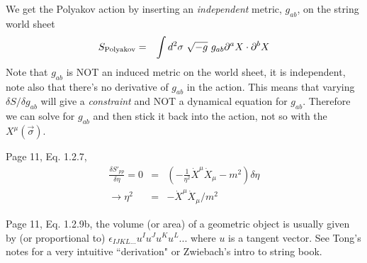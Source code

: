 \documentclass[aps,preprint,preprintnumbers,nofootinbib,showpacs,prd]{revtex4-1}
\newcommand{\nbea}{\begin{eqnarray*}}
\newcommand{\neea}{\end{eqnarray*}}
\begin{document}
We get the Polyakov action by inserting an {\it independent} metric, $g_{ab}$, on the string world sheet
%
\nbea
S_{\rm Polyakov} & = & \int d^2\sigma~ \sqrt{-g} ~ g_{ab} \partial^a X \cdot \partial^b X
\neea
%
Note that $g_{ab}$ is NOT an induced metric on the world sheet, it is independent, note also that there's no derivative of $g_{ab}$ in the action. This means that varying $\delta S/\delta g_{ab}$ will give a {\it constraint} and NOT a dynamical equation for $g_{ab}$. Therefore we can solve for $g_{ab}$ and then stick it back into the action, not so with the $X^\mu(\vec \sigma)$.

Page 11, Eq. 1.2.7,
%
\nbea
\frac{\delta S'_{pp}}{\delta \eta} = 0 & = & \left ( -\frac{1}{\eta^2} \dot X^\mu \dot X_\mu - m^2 \right ) \delta \eta\\
\rightarrow \eta^2 & = & -\dot X^\mu \dot X_\mu / m^2
\neea
%

Page 11, Eq. 1.2.9b, the volume (or area) of a geometric object is usually given by (or proportional to) $\epsilon_{IJKL ...} u^I u^J u^K u^L ...$ where $u$ is a tangent vector. See Tong's notes for a very intuitive ``derivation" or Zwiebach's intro to string book.
\end{document}
